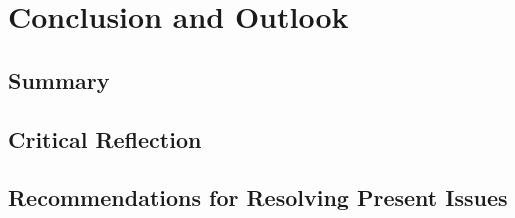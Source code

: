 \chapter{Conclusion and Outlook}
\label{ch:conclusion}

\section{Summary}
\label{sec:concl-summary}


\section{Critical Reflection}
\label{sec:concl-reflection}


\section{Recommendations for Resolving Present Issues}
\label{sec:concl-recommendations}

